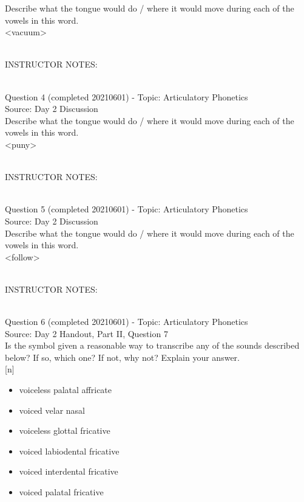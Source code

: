 \documentclass[12pt]{article}
\begin{document}
Describe what the tongue would do / where it would move during each of the vowels in this word.\\

<vacuum>


~\\
INSTRUCTOR NOTES: 


~\\

{\large Question 4} (completed 20210601) - Topic: Articulatory Phonetics\\
Source: Day 2 Discussion\\

Describe what the tongue would do / where it would move during each of the vowels in this word.\\

<puny>


~\\
INSTRUCTOR NOTES: 


~\\

{\large Question 5} (completed 20210601) - Topic: Articulatory Phonetics\\
Source: Day 2 Discussion\\

Describe what the tongue would do / where it would move during each of the vowels in this word.\\

<follow>


~\\
INSTRUCTOR NOTES: 


~\\

{\large Question 6} (completed 20210601) - Topic: Articulatory Phonetics\\
Source: Day 2 Handout, Part II, Question 7\\

Is the symbol given a reasonable way to transcribe any of the sounds described below? If so, which one? If not, why not? Explain your answer.\\

{[n]}

\begin{itemize} \item voiceless palatal affricate \item voiced velar nasal \item voiceless glottal fricative \item voiced labiodental fricative \item voiced interdental fricative \item voiced palatal fricative \end{itemize}
\end{document}
